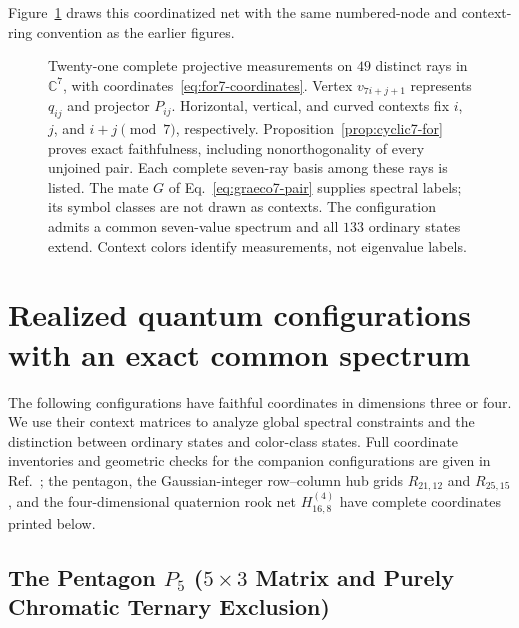 \documentclass[aps,pra,reprint,superscriptaddress,longbibliography,nofootinbib,floatfix,10pt]{revtex4-2}
\theoremstyle{definition}\newtheorem{definition}[theorem]{Definition}
\theoremstyle{remark}\newtheorem{remark}[theorem]{Remark}
\begin{document}
Figure~\ref{fig:cyclic-for-hypergraph} draws this coordinatized net with the same numbered-node and context-ring convention as the earlier figures.
\begin{figure}[t]
\centering

\caption{Twenty-one complete projective measurements on $49$ distinct rays in $\mathbb C^7$, with coordinates~\eqref{eq:for7-coordinates}. Vertex $v_{7i+j+1}$ represents $q_{ij}$ and projector $P_{ij}$. Horizontal, vertical, and curved contexts fix $i$, $j$, and $i+j\pmod7$, respectively. Proposition~\ref{prop:cyclic7-for} proves exact faithfulness, including nonorthogonality of every unjoined pair. Each complete seven-ray basis among these rays is listed. The mate $G$ of Eq.~\eqref{eq:graeco7-pair} supplies spectral labels; its symbol classes are not drawn as contexts. The configuration admits a common seven-value spectrum and all $133$ ordinary states extend. Context colors identify measurements, not eigenvalue labels.}\label{fig:cyclic-for-hypergraph}
\end{figure}



\section{Realized quantum configurations with an exact common spectrum}\label{sec:exact-palette}

The following configurations have faithful coordinates in dimensions three or four. We use their context matrices to analyze global spectral constraints and the distinction between ordinary states and color-class states. Full coordinate inventories and geometric checks for the companion configurations are given in Ref.~\cite{svozil2026contexts,supplement}; the pentagon, the Gaussian-integer row--column hub grids $R_{21,12}$ and $R_{25,15}$, and the four-dimensional quaternion rook net $H_{16,8}^{(4)}$ have complete coordinates printed below.

\subsection{The Pentagon \texorpdfstring{$P_5$}{P5} (\texorpdfstring{$5\times 3$}{5x3} Matrix and Purely Chromatic Ternary Exclusion)}\label{sec:P5}
\end{document}
